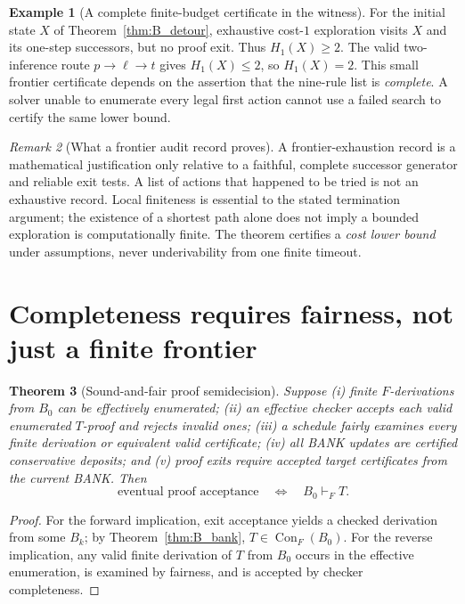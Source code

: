 \documentclass[11pt,letterpaper]{article}
\newtheorem{theorem}{Theorem}[section]
\theoremstyle{definition}
\newtheorem{example}[theorem]{Example}
\theoremstyle{remark}
\newtheorem{remark}[theorem]{Remark}
\newcommand{\Con}{\operatorname{Con}_{F}}
\newcommand{\Hone}{H_{1}}
\begin{document}
\begin{example}[A complete finite-budget certificate in the witness]
For the initial state $X$ of Theorem~\ref{thm:B_detour}, exhaustive cost-$1$ exploration visits $X$ and its one-step successors, but no proof exit. Thus $\Hone(X)\ge2$. The valid two-inference route $p\to\ell\to t$ gives $\Hone(X)\le2$, so $\Hone(X)=2$. This small frontier certificate depends on the assertion that the nine-rule list is \emph{complete}. A solver unable to enumerate every legal first action cannot use a failed search to certify the same lower bound.
\end{example}

\begin{remark}[What a frontier audit record proves]
A frontier-exhaustion record is a mathematical justification only relative to a faithful, complete successor generator and reliable exit tests. A list of actions that happened to be tried is not an exhaustive record. Local finiteness is essential to the stated termination argument; the existence of a shortest path alone does not imply a bounded exploration is computationally finite. The theorem certifies a \emph{cost lower bound} under assumptions, never underivability from one finite timeout.
\end{remark}

\section{Completeness requires fairness, not just a finite frontier}
\begin{theorem}[Sound-and-fair proof semidecision]\label{thm:B_semi}
Suppose (i) finite $F$-derivations from $B_0$ can be effectively enumerated; (ii) an effective checker accepts each valid enumerated $T$-proof and rejects invalid ones; (iii) a schedule fairly examines every finite derivation or equivalent valid certificate; (iv) all BANK updates are certified conservative deposits; and (v) proof exits require accepted target certificates from the current BANK. Then
\[
\text{eventual proof acceptance}\quad\Longleftrightarrow\quad B_0\vdash_F T.
\]
\end{theorem}
\begin{proof}
For the forward implication, exit acceptance yields a checked derivation from some $B_k$; by Theorem~\ref{thm:B_bank}, $T\in\Con(B_0)$. For the reverse implication, any valid finite derivation of $T$ from $B_0$ occurs in the effective enumeration, is examined by fairness, and is accepted by checker completeness.
\end{proof}
\end{document}

